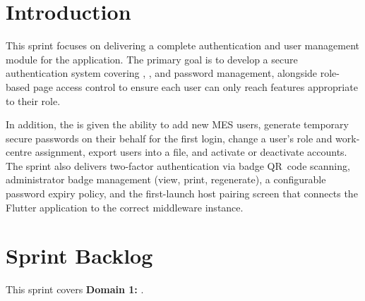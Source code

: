 \section*{Introduction}

This sprint focuses on delivering a complete authentication and user management
module for the  application. The primary goal is to develop a
secure authentication system covering , , and
password management, alongside role-based page access control to ensure each
user can only reach features appropriate to their role.

In addition, the  is given the ability to add new MES
users, generate temporary secure passwords on their behalf for the first login,
change a user's role and work-centre assignment, export users into a file, and 
activate or deactivate accounts. The sprint also delivers two-factor authentication
via badge QR~code scanning, administrator badge management (view, print, regenerate), 
a configurable password expiry policy, and the first-launch host pairing screen
that connects the Flutter application to the correct  middleware 
instance.


\section{Sprint Backlog}

This sprint covers \textbf{Domain 1:} \textbf{}.



